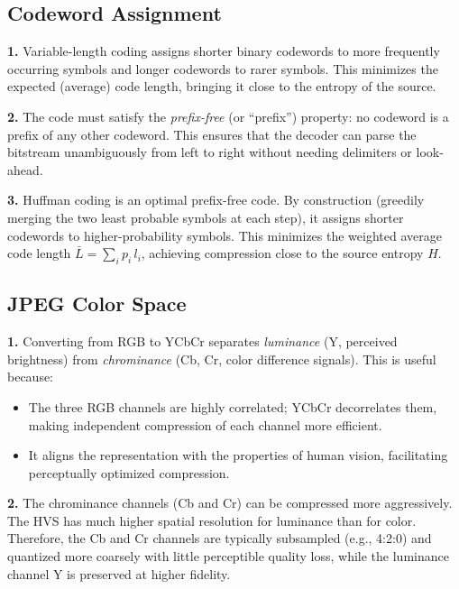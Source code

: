 \documentclass[11pt,a4paper]{article}
\begin{document}
\subsection{Codeword Assignment}

\textbf{1.} Variable-length coding assigns shorter binary codewords to more frequently occurring symbols and longer codewords to rarer symbols.  This minimizes the expected (average) code length, bringing it close to the entropy of the source.

\medskip
\textbf{2.} The code must satisfy the \emph{prefix-free} (or ``prefix'') property: no codeword is a prefix of any other codeword.  This ensures that the decoder can parse the bitstream unambiguously from left to right without needing delimiters or look-ahead.

\medskip
\textbf{3.} Huffman coding is an optimal prefix-free code.  By construction (greedily merging the two least probable symbols at each step), it assigns shorter codewords to higher-probability symbols.  This minimizes the weighted average code length $\bar{L} = \sum_i p_i \, l_i$, achieving compression close to the source entropy $H$.

\subsection{JPEG Color Space}

\textbf{1.} Converting from RGB to YCbCr separates \emph{luminance} (Y, perceived brightness) from \emph{chrominance} (Cb, Cr, color difference signals).  This is useful because:
\begin{itemize}[nosep]
  \item The three RGB channels are highly correlated; YCbCr decorrelates them, making independent compression of each channel more efficient.
  \item It aligns the representation with the properties of human vision, facilitating perceptually optimized compression.
\end{itemize}

\medskip
\textbf{2.} The chrominance channels (Cb and Cr) can be compressed more aggressively.  The HVS has much higher spatial resolution for luminance than for color.  Therefore, the Cb and Cr channels are typically subsampled (e.g., 4:2:0) and quantized more coarsely with little perceptible quality loss, while the luminance channel Y is preserved at higher fidelity.
\end{document}
